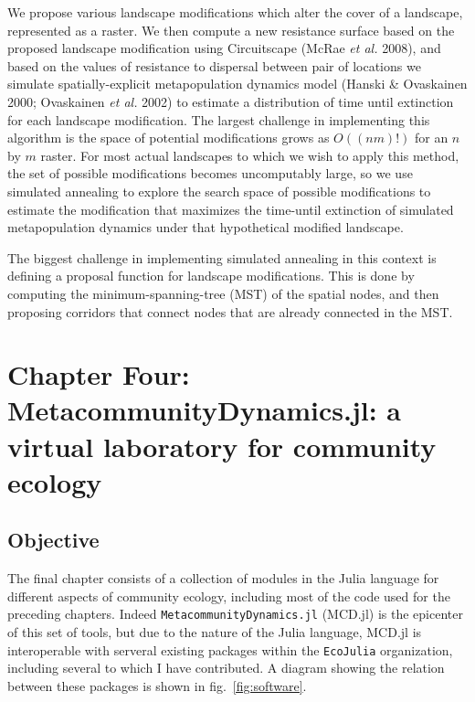 \documentclass[11pt]{article}
\begin{document}
We propose various landscape modifications which alter the cover of a
landscape, represented as a raster. We then compute a new resistance
surface based on the proposed landscape modification using Circuitscape
(McRae \emph{et al.} 2008), and based on the values of resistance to
dispersal between pair of locations we simulate spatially-explicit
metapopulation dynamics model (Hanski \& Ovaskainen 2000; Ovaskainen
\emph{et al.} 2002) to estimate a distribution of time until extinction
for each landscape modification. The largest challenge in implementing
this algorithm is the space of potential modifications grows as
\(O((nm)!)\) for an \(n\) by \(m\) raster. For most actual landscapes to
which we wish to apply this method, the set of possible modifications
becomes uncomputably large, so we use simulated annealing to explore the
search space of possible modifications to estimate the modification that
maximizes the time-until extinction of simulated metapopulation dynamics
under that hypothetical modified landscape.

The biggest challenge in implementing simulated annealing in this
context is defining a proposal function for landscape modifications.
This is done by computing the minimum-spanning-tree (MST) of the spatial
nodes, and then proposing corridors that connect nodes that are already
connected in the MST.

\hypertarget{chapter-four-metacommunitydynamics.jl-a-virtual-laboratory-for-community-ecology}{%
\section{Chapter Four: MetacommunityDynamics.jl: a virtual laboratory
for community
ecology}\label{chapter-four-metacommunitydynamics.jl-a-virtual-laboratory-for-community-ecology}}

\hypertarget{objective-1}{%
\subsection{Objective}\label{objective-1}}

The final chapter consists of a collection of modules in the Julia
language for different aspects of community ecology, including most of
the code used for the preceding chapters. Indeed
\texttt{MetacommunityDynamics.jl} (MCD.jl) is the epicenter of this set
of tools, but due to the nature of the Julia language, MCD.jl is
interoperable with serveral existing packages within the
\texttt{EcoJulia} organization, including several to which I have
contributed. A diagram showing the relation between these packages is
shown in fig.~\ref{fig:software}.
\end{document}
